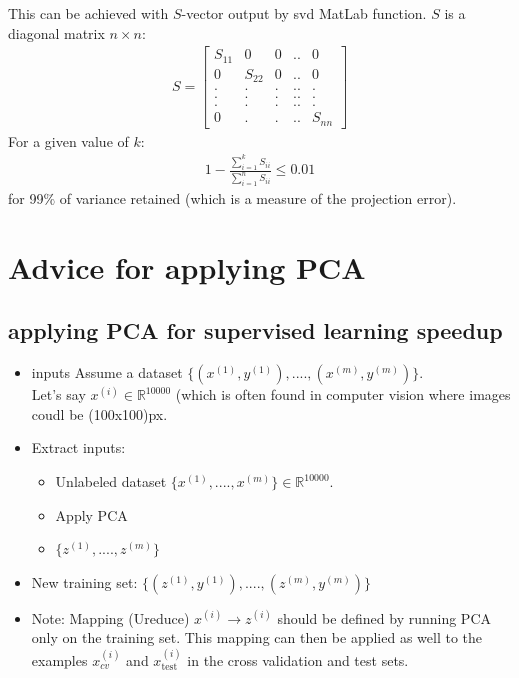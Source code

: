 \documentclass[a4paper,12pt]{report}
\begin{document}
This can be achieved with $S$-vector output by svd MatLab function. $S$ is a diagonal matrix $n \times n$:
\begin{align}
S = \left[ \begin{smallmatrix} S_{11} & 0& 0&.. &0 \\ 0 & S_{22}& 0&.. &0 \\ . & .& .&.. &. \\. &.& .&.. &. \\. &.& .&.. &.\\ 0 & .& .&.. &S_{nn} \end{smallmatrix} \right]
\end{align}
For a given value of $k$:
\begin{align}
1- \frac{\sum_{i=1} ^k S_{ii}}{\sum_{i=1} ^n S_{ii}} \leq 0.01
\end{align}
for 99$\%$ of variance retained (which is a measure of the projection error).

\section{Advice for applying PCA}
\subsection{applying PCA for supervised learning speedup}
\begin{itemize}
\item inputs
Assume a dataset $\{(x^{(1)},y^{(1)}), ....,(x^{(m)},y^{(m)})  \}$.\\
Let's say $x^{(i)} \in \mathbb{R}^{10000}$ (which is often found in computer vision where images coudl be (100x100)px.
\item Extract inputs:\\
\begin{itemize} 
\item Unlabeled dataset  $\{x^{(1)}, ....,x^{(m)}  \} \in \mathbb{R}^{10000}$.
\item Apply PCA
\item $\{z^{(1)}, ....,z^{(m)}  \}$
\end{itemize}
\item New training set: $\{(z^{(1)},y^{(1)}), ....,(z^{(m)},y^{(m)})  \}$
\end{itemize}

\begin{itemize}
\item Note: Mapping (Ureduce) $x^{(i)} \rightarrow z^{(i)}$ should be defined by running PCA only on the training set. This mapping can then be applied as well to the examples $x_{cv} ^{(i)}$ and $x_{\text{test}} ^{(i)}$ in the cross validation and test sets.
\end{itemize}
\end{document}
